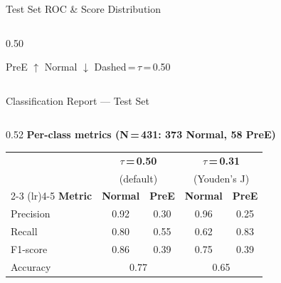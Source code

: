 \documentclass[10pt,aspectratio=169]{beamer}
\begin{document}
\begin{frame}{Test Set ROC \& Score Distribution}
\begin{columns}[T]
\begin{column}{0.50\textwidth}

      {\scriptsize PreE $\uparrow$ \quad Normal $\downarrow$ \quad Dashed\,=\,$\tau$\,=\,0.50}
    \end{column}
  \end{columns}
\end{frame}

\begin{frame}{Classification Report --- Test Set}
  \begin{columns}[T]
    \begin{column}{0.52\textwidth}
      \centering
      {\small\bfseries Per-class metrics (N\,=\,431: 373 Normal, 58 PreE)}\\[0.5em]
      \renewcommand{\arraystretch}{1.3}
      \footnotesize
      \begin{tabular}{@{}l cc cc@{}}
        \toprule
        & \multicolumn{2}{c}{\bfseries $\tau$\,=\,0.50} &
          \multicolumn{2}{c}{\bfseries $\tau$\,=\,0.31} \\
        &  \multicolumn{2}{c}{\scriptsize(default)} &
           \multicolumn{2}{c}{\scriptsize(Youden's J)} \\
        \cmidrule(lr){2-3} \cmidrule(lr){4-5}
        \textbf{Metric} & \textbf{Normal} & \textbf{PreE}
                         & \textbf{Normal} & \textbf{PreE} \\
        \midrule
        Precision  & 0.92 & 0.30 & 0.96 & 0.25 \\
        Recall     & 0.80 & 0.55 & 0.62 & 0.83 \\
        F1-score   & 0.86 & 0.39 & 0.75 & 0.39 \\
        \midrule
        Accuracy   & \multicolumn{2}{c}{0.77} & \multicolumn{2}{c}{0.65} \\
        \bottomrule
      \end{tabular}


\end{column}
\end{columns}
\end{frame}
\end{document}
